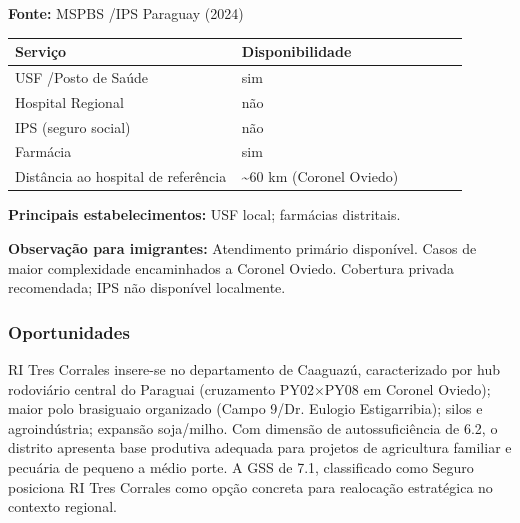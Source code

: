 \textbf{Fonte:} MSPBS /\allowbreak  IPS Paraguay (2024)

{\def\LTcaptype{none} %
\begin{longtable}{@{}>{\raggedright\arraybackslash}p{0.45\linewidth} >{\raggedright\arraybackslash}p{0.45\linewidth}@{}}
\toprule\noalign{}
Serviço & Disponibilidade \\
\midrule\noalign{}
\endhead
\bottomrule\noalign{}
\endlastfoot
USF /\allowbreak  Posto de Saúde & sim \\
Hospital Regional & não \\
IPS (seguro social) & não \\
Farmácia & sim \\
Distância ao hospital de referência & \textasciitilde60 km (Coronel
Oviedo) \\
\end{longtable}
}

\textbf{Principais estabelecimentos:} USF local; farmácias distritais.

\textbf{Observação para imigrantes:} Atendimento primário disponível.
Casos de maior complexidade encaminhados a Coronel Oviedo. Cobertura
privada recomendada; IPS não disponível localmente.
\newpage

\subsubsection*{Oportunidades}\label{oport-ri-tres-corrales-0518}
RI Tres Corrales insere-se no departamento de Caaguazú, caracterizado por hub rodoviário central do Paraguai (cruzamento PY02×PY08 em Coronel Oviedo); maior polo brasiguaio organizado (Campo 9/Dr. Eulogio Estigarribia); silos e agroindústria; expansão soja/milho. Com dimensão de autossuficiência de 6.2, o distrito apresenta base produtiva adequada para projetos de agricultura familiar e pecuária de pequeno a médio porte. A GSS de 7.1, classificado como Seguro posiciona RI Tres Corrales como opção concreta para realocação estratégica no contexto regional.

